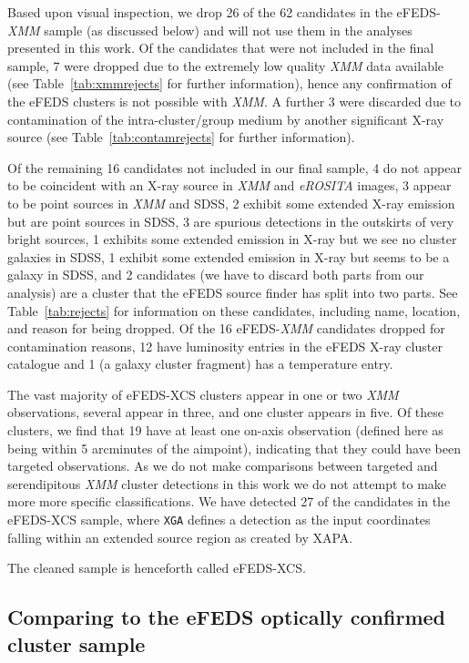 \documentclass[fleqn,usenatbib]{mnras}
\begin{document}
Based upon visual inspection, we drop 26 of the 62 candidates in the eFEDS-{\em XMM} sample (as discussed below) and will not use them in the analyses presented in this work.  Of the candidates that were not included in the final sample, 7 were dropped due to the extremely low quality {\em XMM} data available (see Table~\ref{tab:xmmrejects} for further information), hence any confirmation of the eFEDS clusters is not possible with {\em XMM}.  A further 3  were discarded due to contamination of the intra-cluster/group medium by another significant X-ray source (see Table~\ref{tab:contamrejects} for further information).

Of the remaining 16 candidates not included in our final sample, 4 do not appear to be coincident with an X-ray source in {\em XMM} and {\em eROSITA} images, 3 appear to be point sources in {\em XMM} and SDSS, 2 exhibit some extended X-ray emission but are point sources in SDSS, 3 are spurious detections in the outskirts of very bright sources, 1 exhibits some extended emission in X-ray but we see no cluster galaxies in SDSS, 1 exhibit some extended emission in X-ray but seems to be a galaxy in SDSS, and 2 candidates (we have to discard both parts from our analysis) are a cluster that the eFEDS source finder has split into two parts. See Table~\ref{tab:rejects} for information on these candidates, including name, location, and reason for being dropped. Of the 16 eFEDS-{\em XMM} candidates dropped for contamination reasons, 12 have luminosity entries in the eFEDS X-ray cluster catalogue and 1 (a galaxy cluster fragment) has a temperature entry.

The vast majority of eFEDS-XCS clusters appear in one or two {\em XMM} observations, several appear in three, and one cluster appears in five. Of these clusters, we find that 19 have at least one on-axis observation (defined here as being within 5 arcminutes of the aimpoint), indicating that they could have been targeted observations. As we do not make comparisons between targeted and serendipitous {\em XMM} cluster detections in this work we do not attempt to make more more specific classifications. We have detected 27 of the candidates in the eFEDS-XCS sample, where \texttt{XGA} defines a detection as the input coordinates falling within an extended source region as created by XAPA.

The cleaned sample is henceforth called eFEDS-XCS. 

\subsection{Comparing to the eFEDS optically confirmed cluster sample}
\end{document}
